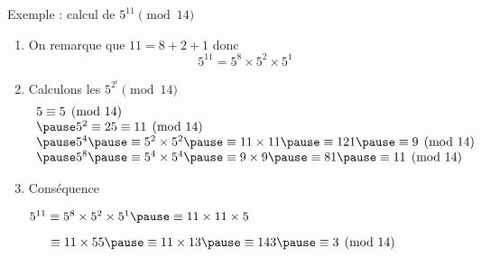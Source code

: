 \begin{frame}



\bigskip
\pause

Exemple : calcul de $5^{11} \pmod{14}$
\pause
\begin{enumerate}
  \item On remarque que $11 = 8 + 2 + 1$
\pause
donc\vspace*{-1ex}
$$5 ^{11} = 5^8 \times 5^2 \times 5^1$$

\pause
  \item Calculons les $5^{2^i} \pmod {14}$ 
\pause\vspace*{-1ex}
$$
\begin{array}{l}
5  \equiv  5 \pmod{14} \\
\pause
5^2  \equiv  25 \equiv 11 \pmod{14} \\
\pause
5^4  \pause \equiv 5^2 \times 5^2 \pause \equiv 11 \times 11 \pause \equiv 121 \pause\equiv 9 \pmod{14} \\
\pause
5^8  \pause\equiv 5^4 \times 5^4 \pause\equiv 9 \times 9 \pause\equiv 81 \pause\equiv 11 \pmod{14} \\
\end{array}
$$

\pause  
  \item Conséquence 
  
\qquad \qquad $5^{11} \equiv 5^8 \times 5^2 \times 5^1 \pause \equiv 11 \times 11 \times 5$

\pause\qquad\qquad$\quad \ \  \equiv 11 \times 55 \pause\equiv 11 \times 13 \pause\equiv 143 \pause\equiv 3 \pmod{14}$
\end{enumerate}

\end{frame}

